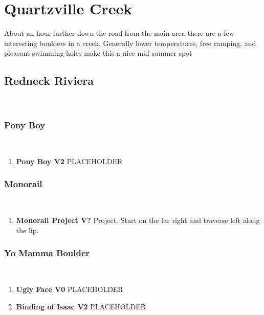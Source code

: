 \chapter{Quartzville Creek}\label{a:Quartzville Creek}
\lhead{\textcolor{\chapterColor}{\rule[-2pt]{\textwidth}{15pt}}}
About an hour further down the road from the main area there are a few interesting boulders in a creek. Generally lower temperatures, free camping, and pleasant swimming holes make this a nice mid summer spot

\section{Redneck Riviera}\label{sa:Redneck Riviera}
\

\subsection*{Pony Boy}\label{bf:Pony Boy}
\

\begin{enumerate}[]
	\item\label{rt:Pony Boy} \colorbox{green!20}{\textbf{Pony Boy V2  } }
	\newline PLACEHOLDER\
\end{enumerate}
\subsection*{Monorail}\label{bf:Monorail}
\

\begin{enumerate}[resume]
	\item\label{rt:Monorail Project} \colorbox{black!20}{\textbf{Monorail Project V?  } }
	\newline Project. Start on the far right and traverse left along the lip.\
\end{enumerate}
\subsection*{Yo Mamma Boulder}\label{bf:Yo Mamma Boulder}
\

\begin{enumerate}[resume]
	\item\label{rt:Ugly Face} \colorbox{green!20}{\textbf{Ugly Face V0   \warn } }
	\newline PLACEHOLDER\
	\item\label{rt:Binding of Isaac} \colorbox{green!20}{\textbf{Binding of Isaac V2     \warn } }
	\newline PLACEHOLDER\
\end{enumerate}
